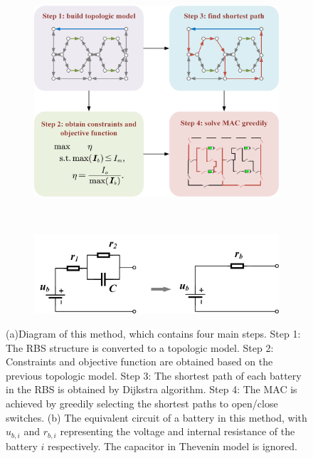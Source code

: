 \documentclass{article}
\begin{document}
\begin{figure}[htbp]
    \centering
    \begin{subfigure}[b]{\textwidth}
        \includegraphics[width=\textwidth]{../attachments/main.png}
        \caption{}
        \label{fig:main}
    \end{subfigure}
    \\ 
    \begin{subfigure}[b]{\textwidth}
        \includegraphics[width=\textwidth]{../attachments/battery_simple.png}
        \caption{}
        \label{fig:battery_simple}
    \end{subfigure}
    \caption{(a)Diagram of this method, which contains four main steps.
    Step 1: The RBS structure is converted to a topologic model.
    Step 2: Constraints and objective function are obtained based on the previous topologic model.
    Step 3: The shortest path of each battery in the RBS is obtained by Dijkstra algorithm.
    Step 4: The MAC is achieved by greedily selecting the shortest paths to open/close switches.
    (b) The equivalent circuit of a battery in this method, with $u_{b,i}$ and $r_{b,i}$ representing the voltage and internal resistance of the battery $i$ respectively.
    The capacitor in Thevenin model is ignored.
    }
\end{figure}
\end{document}
